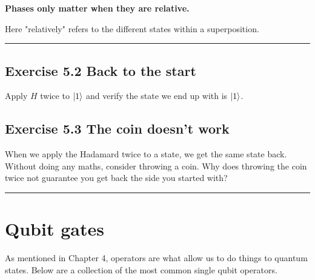 \documentclass{book}
\begin{document}
\textbf{Phases only matter when they are relative.}

Here "relatively" refers to the different states within a superposition.

\hrule

\subsection{Exercise 5.2 Back to the start}

Apply $H$ twice to $\ket{1}$ and verify the state we end up with is $\ket{1}$. 

\subsection{Exercise 5.3 The coin doesn't work}

When we apply the Hadamard twice to a state, we get the same state back. Without doing any maths, consider throwing a coin. Why does throwing the coin twice not guarantee you get back the side you started with? 

\vspace{5mm} %

\hrule \section{Qubit gates }

As mentioned in Chapter 4, operators are what allow us to do things to quantum states. Below are a collection of the most common single qubit operators. 
\end{document}

